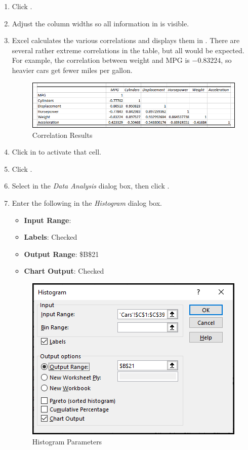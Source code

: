 \begin{enumerate}[resume]
	\item Click .
	\item Adjust the column widths so all information in  is visible.
	\item Excel calculates the various correlations and displays them in . There are several rather extreme correlations in the table, but all would be expected. For example, the correlation between weight and MPG is $ -0.83224 $, so heavier cars get fewer miles per gallon.
	
	\begin{figure}[H]
		\centering
		\includegraphics[width=\maxwidth{.95\linewidth}]{gfx/ch09_fig75}
		\caption{Correlation Results}
		\label{09:fig75}
	\end{figure}

	\item Click in  to activate that cell.
	\item Click .
	\item Select  in the \textit{Data Analysis} dialog box, then click .
	\item Enter the following in the \textit{Histogram} dialog box.

	\begin{itemize}
		\item \textbf{Input Range}: 
		\item \textbf{Labels}: Checked
		\item \textbf{Output Range}: \$B\$21
		\item \textbf{Chart Output}: Checked
	\end{itemize}
	
	\begin{figure}[H]
		\centering
		\includegraphics[width=\maxwidth{.75\linewidth}]{gfx/ch09_fig76}
		\caption{Histogram Parameters}
		\label{09:fig76}
	\end{figure}


\end{enumerate}

